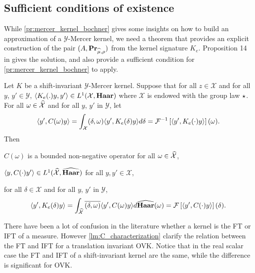 \subsection{Sufficient conditions of existence}
\label{subsec:sufficient_conditions}
While \cref{pr:mercer_kernel_bochner} gives some insights on how to build an approximation of a $\mathcal{Y}$-Mercer kernel, we need a theorem that provides an explicit construction of the pair $(A, {\mathbf{{Pr}}}_{\widehat{\mu},\rho})$ from the kernel signature $K_e$. Proposition 14 in \citet{Carmeli2010} gives the solution, and also provide a sufficient condition for \cref{pr:mercer_kernel_bochner} to apply.
\begin{proposition}
\label{pr:inverse_ovk_Fourier_decomposition}
Let $K$ be a shift-invariant $\mathcal{Y}$-Mercer kernel. %
Suppose that for all $z \in \mathcal{X}$ and for all $y$, $y' \in\mathcal{Y}$, $\langle K_e(.)y,y'\rangle\in L^1(\mathcal{X},\mathbf{Haar})$ where $\mathcal{X}$ is endowed with the group law $\star$. For all $\omega \in \widehat{\mathcal{X}}$ and for all $y$, $y'$ in $\mathcal{Y}$, let
\begin{dmath}\label{eq:CK0}
\inner{y',C(\omega)y} = \int_{\mathcal{X}} \pairing{\delta, \omega}\inner{y', K_e(\delta)y}d\delta = \IFT{\inner{y', K_e(\cdot)y}}(\omega).
\end{dmath}
Then
\begin{propenum}
\item $C(\omega)$ is a bounded non-negative operator for all $\omega \in \widehat{\mathcal{X}}$,
\item $\langle y, C(\cdot)y'\rangle\in L^1(\widehat{\mathcal{X}},\widehat{\mathbf{Haar}})$ for all $y,y'\in\mathcal{X}$,
\item for all $\delta\in\mathcal{X}$ and for all $y$, $y'$ in $\mathcal{Y}$,
\begin{dmath*}
\inner{y', K_e(\delta)y}= \int_{\dual{\mathcal{X}}}\conj{\pairing{\delta,\omega}}\inner{y', C(\omega)y}d\dual{\Haar}(\omega)
=\FT{\inner{y', C(\cdot)y}}(\delta).
\end{dmath*}
\end{propenum}
\end{proposition}
There have been a lot of confusion in the literature whether a kernel is the \acl{FT} or \acl{IFT} of a measure. However \cref{lm:C_characterization} clarify the relation between the \acl{FT} and \acl{IFT} for a translation invariant \acl{OVK}. Notice that in the real scalar case the \acl{FT} and \acl{IFT} of a shift-invariant kernel are the same, while the difference is significant for \acs{OVK}.
